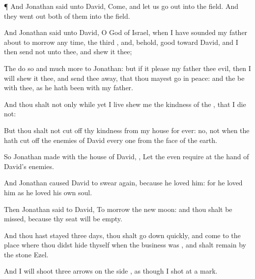 {\par }{\PP {}¶ And
Jonathan
said unto
David,
Come, and let us go
out into the
field. And they went
out
both of them into the
field.

And
Jonathan
said unto
David, O
{}
God of
Israel, when I have
sounded my
father about to
morrow any
time,
{} the
third
{}, and, behold,
{}
good toward
David, and I then
send not unto thee, and
shew it thee;

The
{}
do
so and much
more to
Jonathan: but if it
please my
father
{} thee
evil, then I will
shew it thee, and send thee
away, that thou mayest
go in
peace: and the
{} be with thee, as he hath been with my
father.

And thou shalt not only while
yet I
live
shew me the
kindness of the
{}, that I
die not:

But
{} thou shalt not cut
off thy
kindness from my
house
for
ever: no, not when the
{} hath cut
off the
enemies of
David every
one from the
face of the
earth.

So
Jonathan
made
{} with the
house of
David,
{}, Let the
{} even
require
{} at the
hand of
David’s
enemies.

And
Jonathan caused
David to
swear
again, because he
loved him: for he
loved him as he
loved his own
soul.

Then
Jonathan
said to
David, To
morrow
{} the new
moon: and thou shalt be
missed, because thy
seat will be
empty.

And
{} thou hast stayed three
days,
{} thou shalt go
down
quickly, and
come to the
place where thou didst
hide thyself
when the
business was
{}, and shalt
remain
by the
stone
Ezel.

And I will
shoot
three
arrows on the
side
{}, as though I
shot at a
mark.

}
